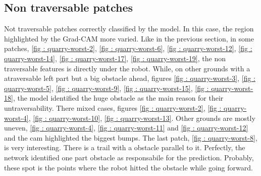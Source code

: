 \subsection{Non traversable patches}
    Not traversable patches correctly classified by the model. In this case, the region highlighted by the Grad-CAM more varied. Like in the previous section, in some patches, \ref{fig : quarry-worst-2}, \ref{fig : quarry-worst-6}, \ref{fig : quarry-worst-12}, \ref{fig : quarry-worst-14}, \ref{fig : quarry-worst-17}, \ref{fig : quarry-worst-19}, the non traversable features is directly under the robot. While, on other grounds with a atraversable left part but a big obstacle ahead, figures \ref{fig : quarry-worst-3}, \ref{fig : quarry-worst-5}, \ref{fig : quarry-worst-9}, \ref{fig : quarry-worst-15}, \ref{fig : quarry-worst-18}, the model identified the huge obstacle as the main reason for their untraversability. There mixed cases, figures \ref{fig : quarry-worst-2}, \ref{fig : quarry-worst-4}, \ref{fig : quarry-worst-10}, \ref{fig : quarry-worst-13}. Other grounds are mostly uneven, \ref{fig : quarry-worst-4}, \ref{fig : quarry-worst-11} and \ref{fig : quarry-worst-12} and the cam highlighted the biggest bumps. The last patch, \ref{fig : quarry-worst-8}, is very interesting. There is a trail with a obstacle parallel to it. Perfectly, the network identified one part obstacle as responsabile for the prediction. Probably, these spot is the points where the robot hitted the obstacle while going forward.

